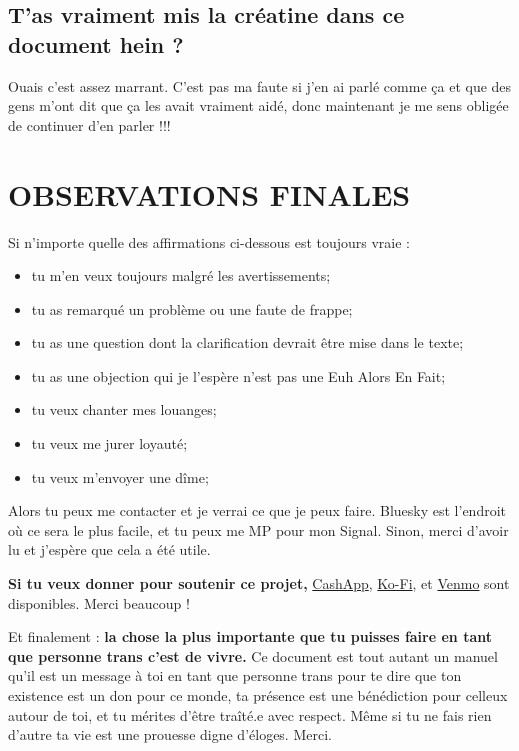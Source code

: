 \documentclass{article}
\begin{document}
\subsection{T'as vraiment mis la créatine dans ce document hein ?}

Ouais c'est assez marrant. C'est pas ma faute si j'en ai parlé comme ça et que des gens m'ont dit que ça les avait vraiment aidé, donc maintenant je me sens obligée de continuer d'en parler !!!



\section{OBSERVATIONS FINALES}

Si n'importe quelle des affirmations ci-dessous est toujours vraie :

\begin{itemize}
\item tu m'en veux toujours malgré les avertissements;

\item tu as remarqué un problème ou une faute de frappe;

\item tu as une question dont la clarification devrait être mise dans le texte;

\item tu as une objection qui je l'espère n'est pas une Euh Alors En Fait;

\item tu veux chanter mes louanges;

\item tu veux me jurer loyauté;

\item tu veux m'envoyer une dîme;
\end{itemize}

Alors tu peux me contacter et je verrai ce que je peux faire. Bluesky est l'endroit où ce sera le plus facile, et tu peux me MP pour mon Signal. Sinon, merci d'avoir lu et j'espère que cela a été utile.

\textbf{Si tu veux donner pour soutenir ce projet,} \href{https://cash.app/Katitties}{CashApp}, \href{https://ko-fi.com/katitties}{Ko-Fi}, et \href{https://account.venmo.com/u/katitties}{Venmo} sont disponibles. Merci beaucoup !

Et finalement : \textbf{la chose la plus importante que tu puisses faire en tant que personne trans c'est de vivre.} Ce document est tout autant un manuel qu'il est un message à toi en tant que personne trans pour te dire que ton existence est un don pour ce monde, ta présence est une bénédiction pour celleux autour de toi, et tu mérites d'être traîté.e avec respect. Même si tu ne fais rien d'autre ta vie est une prouesse digne d'éloges. Merci.
\end{document}
